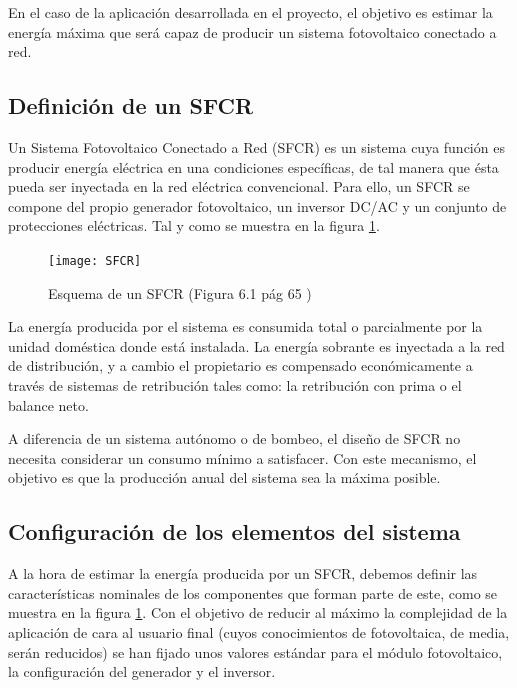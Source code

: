 En el caso de la aplicación desarrollada en el proyecto, el objetivo es estimar la energía máxima que será capaz de producir un sistema fotovoltaico conectado a red.

\subsection{Definición de un SFCR}

Un Sistema Fotovoltaico Conectado a Red (SFCR) es un sistema cuya función es producir energía eléctrica en una condiciones específicas, de tal manera que ésta pueda ser inyectada en la red eléctrica convencional. Para ello, un SFCR se compone del propio generador fotovoltaico, un inversor DC/AC y un conjunto de protecciones eléctricas. Tal y como se muestra en la figura \ref{fig:sfcr}.

\begin{figure}[ht]
\texttt{[image: SFCR]}
\centering
\caption{Esquema de un SFCR (Figura 6.1 pág 65 \cite{esf_book})}
\label{fig:sfcr}
\end{figure}

La energía producida por el sistema es consumida total o parcialmente por la unidad doméstica donde está instalada. La energía sobrante es inyectada a la red de distribución, y a cambio el propietario es compensado económicamente a través de sistemas de retribución tales como: la retribución con prima o el balance neto.

A diferencia de un sistema autónomo o de bombeo, el diseño de SFCR no necesita considerar un consumo mínimo a satisfacer. Con este mecanismo, el objetivo es que la producción anual del sistema sea la máxima posible.

\subsection{Configuración de los elementos del sistema}

A la hora de estimar la energía producida por un SFCR, debemos definir las características nominales de los componentes que forman parte de este, como se muestra en la figura \ref{fig:sfcr}.
Con el objetivo de reducir al máximo la complejidad de la aplicación de cara al usuario final (cuyos conocimientos de fotovoltaica, de media, serán reducidos) se han fijado unos valores estándar para el módulo fotovoltaico, la configuración del generador y el inversor.

\newpage

